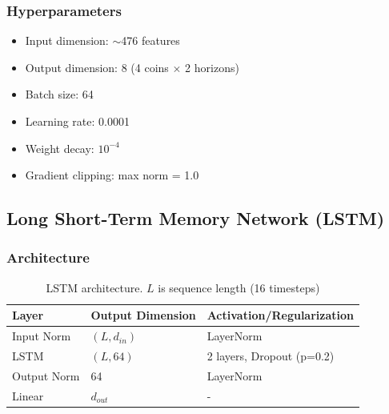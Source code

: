 \documentclass[12pt,a4paper]{article}
\begin{document}
\subsubsection{Hyperparameters}
\begin{itemize}
    \item Input dimension: $\sim$476 features
    \item Output dimension: 8 (4 coins $\times$ 2 horizons)
    \item Batch size: 64
    \item Learning rate: 0.0001
    \item Weight decay: $10^{-4}$
    \item Gradient clipping: max norm = 1.0
\end{itemize}

\subsection{Long Short-Term Memory Network (LSTM)}

\subsubsection{Architecture}
\begin{table}[H]
\centering
\begin{tabular}{lll}
\toprule
\textbf{Layer} & \textbf{Output Dimension} & \textbf{Activation/Regularization} \\
\midrule
Input Norm & $(L, d_{in})$ & LayerNorm \\
LSTM & $(L, 64)$ & 2 layers, Dropout (p=0.2) \\
Output Norm & 64 & LayerNorm \\
Linear & $d_{out}$ & - \\
\bottomrule
\end{tabular}
\caption{LSTM architecture. $L$ is sequence length (16 timesteps)}
\end{table}
\end{document}
